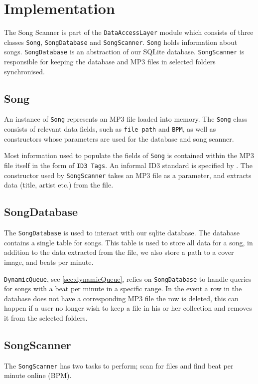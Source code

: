 \section{Implementation}
The Song Scanner is part of the \texttt{DataAccessLayer} module which consists of three classes \texttt{Song}, \texttt{SongDatabase} and \texttt{SongScanner}. \texttt{Song} holds information about songs. \texttt{SongDatabase} is an abstraction of our SQLite database. \texttt{SongScanner} is responsible for keeping the database and MP3 files in selected folders synchronised.

\subsection{Song}
An instance of \texttt{Song} represents an MP3 file loaded into memory. The \texttt{Song} class consists of relevant data fields, such as \texttt{file path} and \texttt{BPM}, as well as constructors whose parameters are used for the database and song scanner. 

Most information used to populate the fields of \texttt{Song} is contained within the MP3 file itself in the form of \texttt{ID3 Tags}. An informal ID3 standard is specified by \citet{ID3:standard}. The constructor used by \texttt{SongScanner} takes an MP3 file as a parameter, and extracts data (title, artist etc.) from the file.

\subsection{SongDatabase}
The \texttt{SongDatabase} is used to interact with our sqlite database. The database contains a single table for songs. This table is used to store all data for a song, in addition to the data extracted from the file, we also store a path to a cover image, and beats per minute.

\texttt{DynamicQueue}, see \cref{sec:dynamicQueue}, relies on \texttt{SongDatabase} to handle queries for songs with a beat per minute in a specific range. In the event a row in the database does not have a corresponding MP3 file the row is deleted, this can happen if a user no longer wish to keep a file in his or her collection and removes it from the selected folders. 

\subsection{SongScanner} 
The \texttt{SongScanner} has two tasks to perform; scan for files and find beat per minute online (BPM).

